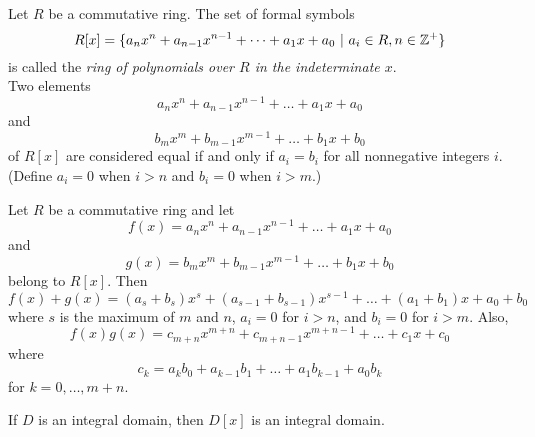 
\begin{definition}
	Let $R$ be a commutative ring. The set of formal symbols
	\[ R[x] = \{a_nx^n + a_{n-1}x^{n-1}+\dots+a_1x + a_0\ \vert\ a_i \in R, n \in \mathbb{Z}^+\} \]
	is called the \textit{ring of polynomials over $R$ in the indeterminate $x$}.\\
	\noindent Two elements
	\[ a_nx^n + a_{n-1}x^{n-1} + \dots + a_1x + a_0 \]
	\noindent and
	\[ b_mx^m + b_{m-1}x^{m-1} + \dots + b_1x + b_0 \]
	\noindent of $R[x]$ are considered equal if and only if $a_i=b_i$ for all nonnegative integers $i$. (Define $a_i=0$ when $i > n$ and $b_i = 0$ when $i > m$.)
\end{definition}

\begin{definition}
	Let $R$ be a commutative ring and let
	\[ f(x) = a_nx^n + a_{n-1}x^{n-1} + \dots + a_1x + a_0 \]
	\noindent and
	\[ g(x) = b_mx^m + b_{m-1}x^{m-1} + \dots + b_1x + b_0 \]
	\noindent belong to $R[x]$. Then
	\[ f(x) + g(x) = (a_s + b_s)x^s + (a_{s-1} + b_{s-1})x^{s-1} + \dots + (a_1 + b_1)x + a_0 + b_0 \]
	\noindent where $s$ is the maximum of $m$ and $n$, $a_i = 0$ for $i > n$, and $b_i = 0$ for $i > m$. Also,
	\[ f(x)g(x) = c_{m+n}x^{m+n}+c_{m+n-1}x^{m+n-1} + \dots + c_1x + c_0 \]
	\noindent where
	\[ c_k = a_kb_0 + a_{k-1}b_1 + \dots + a_1b_{k-1} + a_0b_k \]
	\noindent for $k=0,\dots, m+n$.
\end{definition}

\begin{theorem}
	If $D$ is an integral domain, then $D[x]$ is an integral domain.
\end{theorem}
